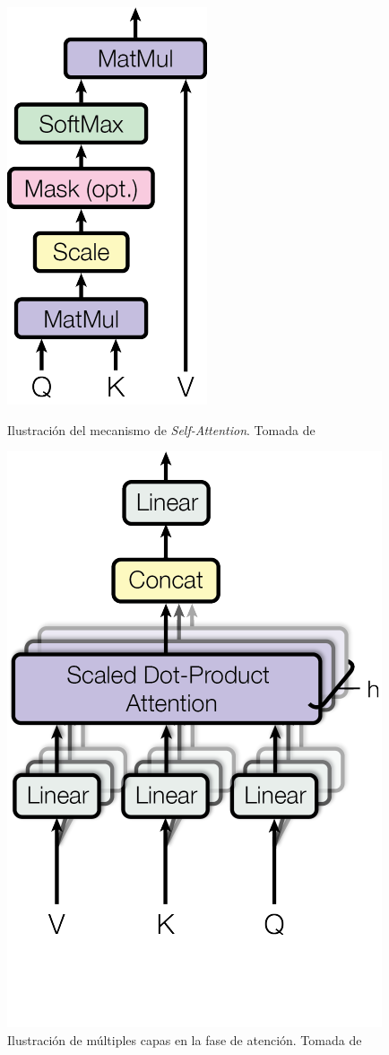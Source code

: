 \begin{itemize}
\begin{figure}
	\begin{minipage}[b]{0.5\linewidth}
		\centering
		\includegraphics[width=0.5\linewidth]{Imagenes/Vectorial/ScaledDotProduct.pdf}
		\caption{Ilustración del mecanismo de \textit{Self-Attention}. Tomada de \cite{vaswani2017attention}}%
		\label{fig:Scaled Dot-Product Attention}
	\end{minipage}
	\begin{minipage}[b]{0.5\linewidth}
		\centering
		\includegraphics[width=0.5\linewidth]{Imagenes/Vectorial/MultiHeadAttention.pdf}
		\caption{Ilustración de múltiples capas en la fase de atención. Tomada de \cite{vaswani2017attention}}%
		\label{fig:Multi-Head Attention}
	\end{minipage}
\end{figure}


\end{itemize}
